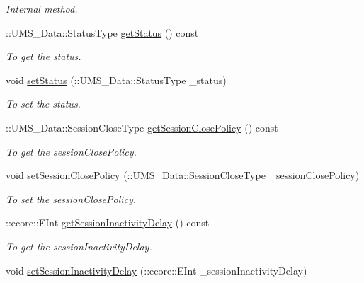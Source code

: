 \begin{DoxyCompactItemize}
\begin{DoxyCompactList}\small\item\em Internal method. \item\end{DoxyCompactList}\item 
::UMS\_\-Data::StatusType \hyperlink{classUMS__Data_1_1ListSessionOptions_aa7b5896dd0f3fe98749f456a282d31db}{getStatus} () const 
\begin{DoxyCompactList}\small\item\em To get the status. \item\end{DoxyCompactList}\item 
void \hyperlink{classUMS__Data_1_1ListSessionOptions_a3cf64b480a647658ca2bce816566fbcb}{setStatus} (::UMS\_\-Data::StatusType \_\-status)
\begin{DoxyCompactList}\small\item\em To set the status. \item\end{DoxyCompactList}\item 
::UMS\_\-Data::SessionCloseType \hyperlink{classUMS__Data_1_1ListSessionOptions_a1483d1cd576a62986f4acad569c55ebd}{getSessionClosePolicy} () const 
\begin{DoxyCompactList}\small\item\em To get the sessionClosePolicy. \item\end{DoxyCompactList}\item 
void \hyperlink{classUMS__Data_1_1ListSessionOptions_accae3963540f8fe7f755b093368d8b8e}{setSessionClosePolicy} (::UMS\_\-Data::SessionCloseType \_\-sessionClosePolicy)
\begin{DoxyCompactList}\small\item\em To set the sessionClosePolicy. \item\end{DoxyCompactList}\item 
::ecore::EInt \hyperlink{classUMS__Data_1_1ListSessionOptions_ab679afd3ca26b233c3ce142bc5664614}{getSessionInactivityDelay} () const 
\begin{DoxyCompactList}\small\item\em To get the sessionInactivityDelay. \item\end{DoxyCompactList}\item 
void \hyperlink{classUMS__Data_1_1ListSessionOptions_add218627582f3e2a0504308d843ba4cf}{setSessionInactivityDelay} (::ecore::EInt \_\-sessionInactivityDelay)

\end{DoxyCompactItemize}
